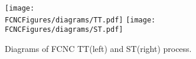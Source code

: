 
\begin{figure}[htb]
\centering
\texttt{[image: \\FCNCFigures/diagrams/TT.pdf]}
\texttt{[image: \\FCNCFigures/diagrams/ST.pdf]}\\
\caption{ Diagrams of FCNC TT(left) and ST(right) process. }
\label{fig:diagrams}
\end{figure}